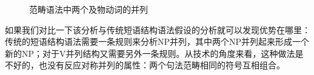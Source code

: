 \begin{exe}
\begin{xlist}[iv.]
\begin{exe}
\begin{xlist}[iv.]
\begin{figure}
\centerline{%
}
\caption{\label{Abb-CG-Koordination-V}范畴语法中两个及物动词的并列}
\end{figure}%

如果我们对比一下该分析与传统短语结构语法假设的分析就可以发现优势在哪里：传统的短语结构语法需要一条规则来分析NP并列，其中两个NP并列起来形成一个新的NP；对于V并列结构又需要另外一条规则。从技术的角度来看，这种做法是不好的，也没有反应对称并列的属性：两个句法范畴相同的符号互相组合。 


\end{xlist}
\end{exe}
\end{xlist}
\end{exe}
